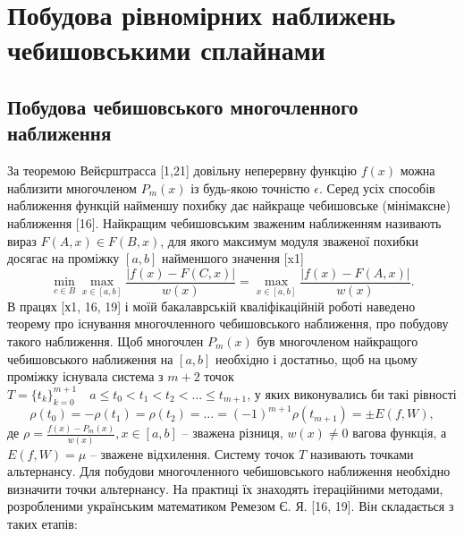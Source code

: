 \documentclass[ukrainian,14pt]{extarticle}
\begin{document}
\newpage

\section{Побудова рівномірних наближень чебишовськими сплайнами}
\subsection{Побудова чебишовського многочленного наближення}
За теоремою Вейєрштрасса [1,21] довільну неперервну функцію $f(x)$  можна наблизити многочленом $P_m(x)$ із будь-якою точністю $\epsilon$. Серед усіх способів наближення функцій найменшу похибку дає найкраще чебишовське (мінімаксне) наближення [16]. Найкращим чебишовським зваженим наближенням називають вираз $F(A, x) \in F(B, x)$, для якого максимум модуля зваженої похибки досягає на проміжку $[a, b]$ найменшого значення [x1]
\begin{equation}\label{eq:formula1}
    \min_{c \in B} \max_{x \in [a,b]} \frac{|f(x) - F(C,x)|}{w(x)} = \max_{x \in [a,b]} \frac{|f(x) - F(A,x)|}{w(x)}.
\end{equation}
В працях [х1, 16, 19] і моїй бакалаврській кваліфікаційній роботі наведено теорему про існування многочленного чебишовського наближення, про побудову такого наближення. Щоб многочлен $P_m(x)$ був многочленом найкращого чебишовського наближення на $[a, b]$ необхідно і достатньо, щоб на цьому проміжку існувала система з $m+2$ точок $T=\{t_k\}_{k=0}^{m+1} \quad a \leq t_0 < t_1 < t_2 < \ldots \leq t_{m+1}$, у яких виконувались би такі рівності
\begin{equation}\label{eq:formula2}
    \rho(t_0) = -\rho(t_1) = \rho(t_2) = \ldots = (-1)^{m+1}\rho(t_{m+1}) = \pm E(f,W),
\end{equation}
де $\rho = \frac{f(x) - P_m(x)}{w(x)}, x \in [a, b]$  – зважена різниця, $w(x) \neq 0$ вагова функція, а $E(f,W) = \mu$ – зважене відхилення. Систему точок $T$ називають точками альтернансу. Для побудови многочленного чебишовського наближення необхідно визначити точки альтернансу. На практиці їх знаходять ітераційними методами, розробленими українським математиком Ремезом Є. Я. [16, 19]. Він складається з таких етапів:
\end{document}
